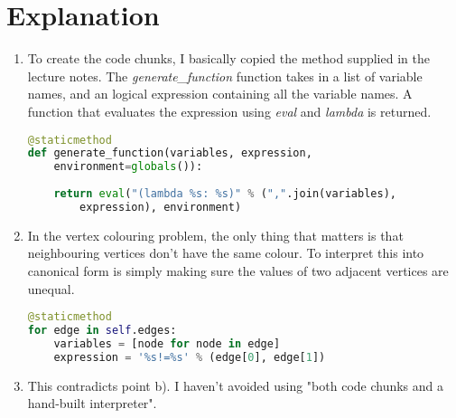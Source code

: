 \documentclass{article}
\begin{document}
\section{Explanation}
\begin{enumerate}[label=\alph*)]
\item To create the code chunks, I basically copied the method supplied in the lecture notes. The \textit{generate\_function} function takes in a list of variable names, and an logical expression containing all the variable names. A function that evaluates the expression using \textit{eval} and \textit{lambda} is returned.
\begin{lstlisting}[language=Python]
@staticmethod
def generate_function(variables, expression,
    environment=globals()):
	
    return eval("(lambda %s: %s)" % (",".join(variables),
        expression), environment)
\end{lstlisting}
\item In the vertex colouring problem, the only thing that matters is that neighbouring vertices don't have the same colour. To interpret this into canonical form is simply making sure the values of two adjacent vertices are unequal.
\begin{lstlisting}[language=Python]
@staticmethod
for edge in self.edges:
    variables = [node for node in edge]
    expression = '%s!=%s' % (edge[0], edge[1])
\end{lstlisting}
\item This contradicts point b). I haven't avoided using "both code chunks and a hand-built interpreter".
\end{enumerate}

\end{document}
